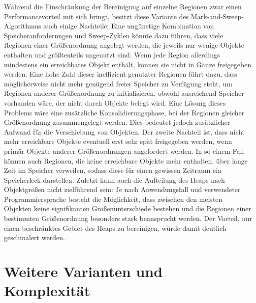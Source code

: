 Während die Einschränkung der Bereinigung auf einzelne Regionen zwar einen Performancevorteil mit sich bringt, besitzt diese Variante des Mark-and-Sweep-Algorithmus auch einige Nachteile:
Eine ungünstige Kombination von Speicheranforderungen und Sweep-Zyklen könnte dazu führen, dass viele Regionen einer Größenordnung angelegt werden, die jeweils nur wenige Objekte enthalten und größtenteils ungenutzt sind.
Wenn jede Region allerdings mindestens ein erreichbares Objekt enthält, können sie nicht in Gänze freigegeben werden.
Eine hohe Zahl dieser ineffizient genutzter Regionen führt dazu, dass möglicherweise nicht mehr genügend freier Speicher zu Verfügung steht, um Regionen anderer Größenordnung zu initialisieren, obwohl ausreichend Speicher vorhanden wäre, der nicht durch Objekte belegt wird.
Eine Lösung dieses Problems wäre eine zusätzliche Konsolidierungsphase, bei der Regionen gleicher Größenordnung zusammengelegt werden.
Dies bedeutet jedoch zusätzlicher Aufwand für die Verschiebung von Objekten.
Der zweite Nachteil ist, dass nicht mehr erreichbare Objekte eventuell erst sehr spät freigegeben werden, wenn primär Objekte anderer Größenordnungen angefordert werden.
In so einem Fall können auch Regionen, die keine erreichbare Objekte mehr enthalten, über lange Zeit im Speicher verweilen, sodass diese für einen gewissen Zeitraum ein Speicherleck darstellen.
Zuletzt kann auch die Aufteilung des Heaps nach Objektgrößen nicht zielführend sein:
Je nach Anwendungsfall und verwendeter Programmiersprache besteht die Möglichkeit, dass zwischen den meisten Objekten keine signifikanten Größenunterschiede bestehen und die Regionen einer bestimmten Größenordnung besonders stark beansprucht werden.
Der Vorteil, nur einen beschränktes Gebiet des Heaps zu bereinigen, würde damit deutlich geschmälert werden.


\section{Weitere Varianten und Komplexität}
\label{sec:mark-sweep-variations}

